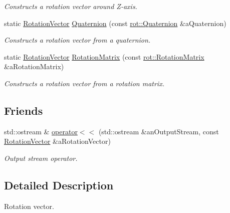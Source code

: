 \begin{DoxyCompactItemize}
\begin{DoxyCompactList}\small\item\em Constructs a rotation vector around Z-\/axis. \end{DoxyCompactList}\item 
static \hyperlink{classostk_1_1math_1_1geom_1_1d3_1_1trf_1_1rot_1_1_rotation_vector}{Rotation\+Vector} \hyperlink{classostk_1_1math_1_1geom_1_1d3_1_1trf_1_1rot_1_1_rotation_vector_a48571eb0d572f0a97caa5aa95a0f1b68}{Quaternion} (const \hyperlink{classostk_1_1math_1_1geom_1_1d3_1_1trf_1_1rot_1_1_quaternion}{rot\+::\+Quaternion} \&a\+Quaternion)
\begin{DoxyCompactList}\small\item\em Constructs a rotation vector from a quaternion. \end{DoxyCompactList}\item 
static \hyperlink{classostk_1_1math_1_1geom_1_1d3_1_1trf_1_1rot_1_1_rotation_vector}{Rotation\+Vector} \hyperlink{classostk_1_1math_1_1geom_1_1d3_1_1trf_1_1rot_1_1_rotation_vector_a70393e9ab7237fbb7510ce19a17abd0c}{Rotation\+Matrix} (const \hyperlink{classostk_1_1math_1_1geom_1_1d3_1_1trf_1_1rot_1_1_rotation_matrix}{rot\+::\+Rotation\+Matrix} \&a\+Rotation\+Matrix)
\begin{DoxyCompactList}\small\item\em Constructs a rotation vector from a rotation matrix. \end{DoxyCompactList}\end{DoxyCompactItemize}
\subsection*{Friends}
\begin{DoxyCompactItemize}
\item 
std\+::ostream \& \hyperlink{classostk_1_1math_1_1geom_1_1d3_1_1trf_1_1rot_1_1_rotation_vector_aa66ba2fd706a441ee39d06857842ecfe}{operator$<$$<$} (std\+::ostream \&an\+Output\+Stream, const \hyperlink{classostk_1_1math_1_1geom_1_1d3_1_1trf_1_1rot_1_1_rotation_vector}{Rotation\+Vector} \&a\+Rotation\+Vector)
\begin{DoxyCompactList}\small\item\em Output stream operator. \end{DoxyCompactList}\end{DoxyCompactItemize}


\subsection{Detailed Description}
Rotation vector. 

